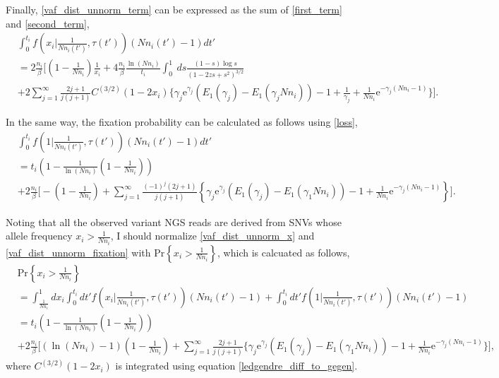 \documentclass{article}
\begin{document}
Finally, \eqref{vaf_dist_unnorm_term} can be expressed as the sum of \eqref{first_term} and \eqref{second_term},
\begin{align}
   & \int_{0}^{t_i} f\left(x_i\Big|\frac{1}{Nn_i(t')}, \tau(t')\right) (Nn_i(t') - 1) dt'\\
   & = 2\frac{n_i}{\beta} \Biggl[(1 - \frac{1}{Nn_i})\frac{1}{x_i} + 4\frac{n_i}{\beta}\frac{\ln(Nn_i)}{t_i} \int_{0}^{1} \: ds \frac{(1-s) \log s}{(1 - 2zs + s^2)^{3/2}}\\
   & + 2 \sum_{j=1}^{\infty}\frac{2j+1}{j(j+1)} C^{(3/2)}(1-2x_i)  \biggl\{ \gamma_j \mathrm{e}^{\gamma_j} \left(E_1(\gamma_j) - E_1(\gamma_j Nn_i)\right) - 1 + \frac{1}{\gamma_j} + \frac{1}{Nn_i}  \mathrm{e}^{-\gamma_j (Nn_i - 1)}
   \Biggr\}
   \Biggr].\label{vaf_dist_unnorm_x}
\end{align}

In the same way, the fixation probability can be calculated as follows using \eqref{loss},
\begin{align}
  & \int_{0}^{t_i} f\left(1\Big|\frac{1}{Nn_i(t')}, \tau(t')\right) (Nn_i(t') - 1) dt'\\
 & = t_i \left(1 - \frac{1}{\ln(Nn_i)}\left(1 - \frac{1}{Nn_i}\right)\right)\\
  & + 2\frac{n_i}{\beta} \Bigg[-(1 - \frac{1}{Nn_i}) + \sum_{j=1}^{\infty}\frac{(-1)^{j}(2j+1)}{j(j+1)} \left\{ \gamma_j \mathrm{e}^{\gamma_j} \left(E_1(\gamma_j) - E_1(\gamma_1 Nn_i)\right) - 1 + \frac{1}{Nn_i}  \mathrm{e}^{-\gamma_j (Nn_i - 1)}
 \right\}
 \Bigg].\label{vaf_dist_unnorm_fixation}
\end{align}

Noting that all the observed variant NGS reads are derived from SNVs whose allele frequency $x_i > \frac{1}{Nn_i}$, I should normalize \eqref{vaf_dist_unnorm_x} and \eqref{vaf_dist_unnorm_fixation} with $\mathrm{Pr}\left\{x_i > \frac{1}{Nn_i}\right\}$, which is calcuated as follows,
\begin{align}
 & \mathrm{Pr}\left\{ x_i > \frac{1}{Nn_i}\right\}\nonumber\\
 & =  \int_{\frac{1}{Nn_i}}^{1} dx_i \int_{0}^{t_i} dt' f\left(x_i\Big|\frac{1}{Nn_i(t')}, \tau(t')\right) (Nn_i(t') - 1) + \int_{0}^{t_i} dt' f\left(1\Big|\frac{1}{Nn_i(t')}, \tau(t')\right) (Nn_i(t') - 1)\nonumber\\
 & = t_i \left(1 - \frac{1}{\ln(Nn_i)}\left(1 - \frac{1}{Nn_i}\right)\right)\nonumber\\
 & + 2\frac{n_i}{\beta} \Bigg[(\ln(Nn_i) -1)(1 - \frac{1}{Nn_i}) + \sum_{j=1}^{\infty}\frac{2j+1}{j(j+1)} \bigl\{ \gamma_j \mathrm{e}^{\gamma_j} \left(E_1(\gamma_j) - E_1(\gamma_1 Nn_i)\right) - 1 + \frac{1}{Nn_i}  \mathrm{e}^{-\gamma_j (Nn_i - 1)}
 \bigr\}
 \Bigg],\label{vaf_dist_unnorm_partition}
\end{align}
where $C^{(3/2)}(1-2x_i)$ is integrated using equation \eqref{ledgendre_diff_to_gegen}.
\end{document}
